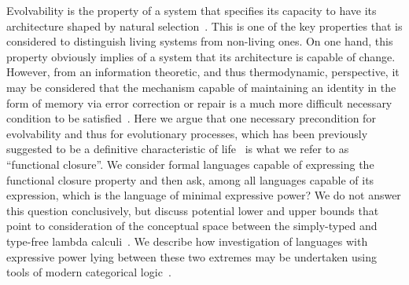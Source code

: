 Evolvability is the property of a system that specifies its capacity to have its architecture shaped by natural selection~\cite{Wagner2008b}. This is one of the key properties that is considered to distinguish living systems from non-living ones. On one hand, this property obviously implies of a system that its architecture is capable of change. However, from an information theoretic, and thus thermodynamic, perspective, it may be considered that the mechanism capable of maintaining an identity in the form of memory via error correction or repair is a much more difficult necessary condition to be satisfied~\cite{Gacs2001}. Here we argue that one necessary precondition for evolvability and thus for evolutionary processes, which has been previously suggested to be a definitive characteristic of life~\cite{Rosen1972,Rosen1991,Zafiris2012,Mossio2009,Letelier2006} is what we refer to as ``functional closure''. We consider formal languages capable of expressing the functional closure property and then ask, among all languages capable of its expression, which is the language of minimal expressive power?  We do not answer this question conclusively, but discuss potential lower and upper bounds that point to consideration of the conceptual space between the simply-typed and type-free lambda calculi~\cite{Barendregt1985}. We describe how investigation of languages with expressive power lying between these two extremes may be undertaken using tools of modern categorical logic~\cite{Crole1994a,Awodey2006}.
